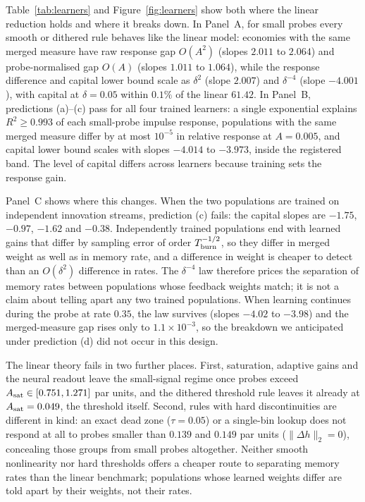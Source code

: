 \documentclass[12pt]{article}
\theoremstyle{definition}
\theoremstyle{remark}
\begin{document}
Table~\ref{tab:learners} and Figure~\ref{fig:learners} show both where the linear reduction holds and where it breaks down. In Panel~A, for small probes every smooth or dithered rule behaves like the linear model: economies with the same merged measure have raw response gap $O(A^2)$ (slopes $2.011$ to $2.064$) and probe-normalised gap $O(A)$ (slopes $1.011$ to $1.064$), while the response difference and capital lower bound scale as $\delta^2$ (slope $2.007$) and $\delta^{-4}$ (slope $-4.001$), with capital at $\delta=0.05$ within $0.1\%$ of the linear $61.42$. In Panel~B, predictions (a)--(c) pass for all four trained learners: a single exponential explains $R^2\ge0.993$ of each small-probe impulse response, populations with the same merged measure differ by at most $10^{-5}$ in relative response at $A=0.005$, and capital lower bound scales with slopes $-4.014$ to $-3.973$, inside the registered band. The level of capital differs across learners because training sets the response gain.

Panel~C shows where this changes. When the two populations are trained on independent innovation streams, prediction (c) fails: the capital slopes are $-1.75$, $-0.97$, $-1.62$ and $-0.38$. Independently trained populations end with learned gains that differ by sampling error of order $T_{\rm burn}^{-1/2}$, so they differ in merged weight as well as in memory rate, and a difference in weight is cheaper to detect than an $O(\delta^2)$ difference in rates. The $\delta^{-4}$ law therefore prices the separation of memory rates between populations whose feedback weights match; it is not a claim about telling apart any two trained populations. When learning continues during the probe at rate $0.35$, the law survives (slopes $-4.02$ to $-3.98$) and the merged-measure gap rises only to $1.1\times10^{-3}$, so the breakdown we anticipated under prediction (d) did not occur in this design.

The linear theory fails in two further places. First, saturation, adaptive gains and the neural readout leave the small-signal regime once probes exceed $A_{\rm sat}\in[0.751,1.271]$ par units, and the dithered threshold rule leaves it already at $A_{\rm sat}=0.049$, the threshold itself. Second, rules with hard discontinuities are different in kind: an exact dead zone ($\tau=0.05$) or a single-bin lookup does not respond at all to probes smaller than $0.139$ and $0.149$ par units ($\|\Delta h\|_2=0$), concealing those groups from small probes altogether. Neither smooth nonlinearity nor hard thresholds offers a cheaper route to separating memory rates than the linear benchmark; populations whose learned weights differ are told apart by their weights, not their rates.
\end{document}
